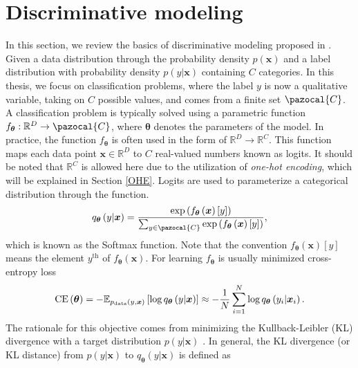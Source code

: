 \section{Discriminative modeling}
In this section, we review the basics of discriminative modeling proposed in \cite{HDGEmain}. Given a data distribution through the probability density $p(\boldsymbol{x})$ and a label distribution with probability density $p(y|\boldsymbol{x})$ containing $C$ categories. In this thesis, we focus on classification problems, where the label $y$ is now a qualitative variable, taking on $C$ possible values, and comes from a finite set $\pazocal{C}$.  A classification problem is typically solved using a parametric function $f_{\boldsymbol{\theta}} : \mathbb{R}^D \to \pazocal{C}$, where $\boldsymbol{\theta}$ denotes the parameters of the model. In practice, the function $f_{\boldsymbol{\theta}}$ is often used in the form of $\mathbb{R}^D \to  \mathbb{R}^C$. This function maps each data point $\boldsymbol{x} \in \mathbb{R}^D$ to $C$ real-valued numbers known as logits. It should be noted that $\mathbb{R}^C$ is allowed here due to the utilization of \emph{one-hot encoding}, which will be explained in Section \ref{OHE}. Logits are used to parameterize a categorical distribution through the function.
\begin{equation}\label{softmax}
	q_{\boldsymbol{\theta}}\left(y|\boldsymbol{x}\right) = \frac{\exp\left({f_{\boldsymbol{\theta}}\left(\boldsymbol{x}\right)[y]}\right)}{\sum_{y\in\pazocal{C}}\exp\left({f_{\boldsymbol{\theta}}\left(\boldsymbol{x}\right)[y]}\right)},
\end{equation}
which is known as the Softmax function. Note that the convention $f_{\boldsymbol{\theta}}\left(\boldsymbol{x}\right)[y]$ means the element $y^{\mathrm{th}}$ of $f_{\boldsymbol{\theta}}\left(\boldsymbol{x}\right)$. For learning $f_{\boldsymbol{\theta}}$ is usually minimized cross-entropy loss 
\begin{equation}\label{crossentropy}
     \mathrm{CE}\left(\boldsymbol{\theta}\right)=-\mathbb{E}_{p_{\mathrm{data}}\left(y,\boldsymbol{x}\right)}\left[\log q_{\boldsymbol{\theta}}\left(y|\boldsymbol{x}\right)\right] \approx -\frac{1}{N}\sum_{i=1}^N\log q_{\boldsymbol{\theta}}\left(y_i|\boldsymbol{x}_i\right).
\end{equation} 
The rationale for this objective comes from minimizing the Kullback-Leibler (KL) divergence with a target distribution $p(y| \boldsymbol{x})$ \cite{KL}. In general, the
KL divergence (or KL distance) from $p(y| \boldsymbol{x})$ to $q_{\boldsymbol{\theta}}\left(y|\boldsymbol{x}\right)$ is defined as
